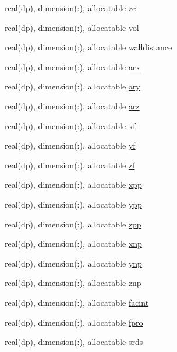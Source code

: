 \begin{DoxyCompactItemize}
real(dp), dimension(\-:), allocatable \hyperlink{classgeometry_accaf072ca71c8cf746b911dfc0165664}{zc}
\item 
real(dp), dimension(\-:), allocatable \hyperlink{classgeometry_a4d57310a2f6f4431e6ec39d9633b3cc5}{vol}
\item 
real(dp), dimension(\-:), allocatable \hyperlink{classgeometry_a51893a5f373a1a6c12894eeb216ecc59}{walldistance}
\item 
real(dp), dimension(\-:), allocatable \hyperlink{classgeometry_a471fde959c1d2bdc45facc53fae5fb5b}{arx}
\item 
real(dp), dimension(\-:), allocatable \hyperlink{classgeometry_a20e05e2b4e25753dc0892a77029b94b8}{ary}
\item 
real(dp), dimension(\-:), allocatable \hyperlink{classgeometry_af05cbfe19f538092a328e02ba17ec1b9}{arz}
\item 
real(dp), dimension(\-:), allocatable \hyperlink{classgeometry_a6be1b0f6e7647b5eea5975c28be87ba3}{xf}
\item 
real(dp), dimension(\-:), allocatable \hyperlink{classgeometry_a6f897e422e91f75c528d0c855a933271}{yf}
\item 
real(dp), dimension(\-:), allocatable \hyperlink{classgeometry_acf0149de3e29b6714898a4db86b62435}{zf}
\item 
real(dp), dimension(\-:), allocatable \hyperlink{classgeometry_adb87ebbb8b31be2d1372108e5057ab11}{xpp}
\item 
real(dp), dimension(\-:), allocatable \hyperlink{classgeometry_a0e0c8bc792d7ff52c12df810cb39bde6}{ypp}
\item 
real(dp), dimension(\-:), allocatable \hyperlink{classgeometry_a55be35632eac8306e28a7d900e1c9cb1}{zpp}
\item 
real(dp), dimension(\-:), allocatable \hyperlink{classgeometry_afd0076c8984ed089741c40a24b176665}{xnp}
\item 
real(dp), dimension(\-:), allocatable \hyperlink{classgeometry_a2fd843e613749c67542f4377ed724ef9}{ynp}
\item 
real(dp), dimension(\-:), allocatable \hyperlink{classgeometry_a40f59df46474b424b2545f108ac317ec}{znp}
\item 
real(dp), dimension(\-:), allocatable \hyperlink{classgeometry_a637d800def3bd03fb7b696a0a31d23f6}{facint}
\item 
real(dp), dimension(\-:), allocatable \hyperlink{classgeometry_a992699ec16084d3f8cf7423b32fc02b6}{fpro}
\item 
real(dp), dimension(\-:), allocatable \hyperlink{classgeometry_ad2388cd69f1b9efc5b4dafab1540e6fd}{srds}

\end{DoxyCompactItemize}
